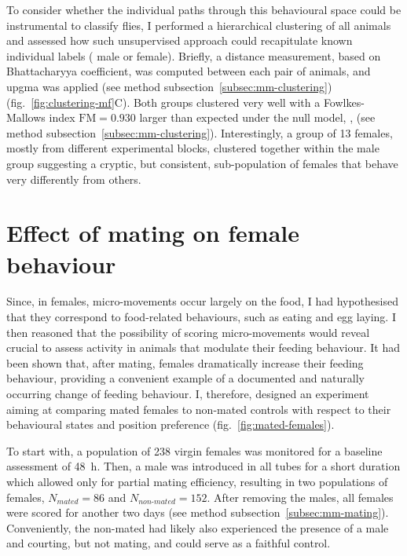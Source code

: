 

To consider whether the individual paths through this behavioural space could be instrumental to classify flies, I performed a hierarchical clustering of all animals and assessed how such unsupervised approach could recapitulate known individual labels (\ie{} male or female).
Briefly, a distance measurement, based on Bhattacharyya coefficient\cite{bhattacharyya_measure_1943}, was computed between each pair of animals, and \gls{upgma}\cite{sokal_statistical_1958} was applied (see method subsection~\ref{subsec:mm-clustering}) (fig.~\ref{fig:clustering-mf}C).
Both groups clustered very well with a
Fowlkes-Mallows index  $\text{FM} = 0.930$ larger than expected under the null model, , (see method subsection~\ref{subsec:mm-clustering}).
Interestingly, a group of 13 females, mostly from different experimental blocks, clustered together within the male group suggesting a cryptic, but consistent, sub-population of females that behave very differently from others.

\section{Effect of mating on female behaviour}

Since, in females, micro-movements occur largely on the food, I had hypothesised that they correspond to food-related behaviours, such as eating and egg laying.
I then reasoned that the possibility of scoring micro-movements would reveal crucial to assess activity in animals that modulate their feeding behaviour.
It had been shown that, after mating, females \dmel{} dramatically increase their feeding behaviour\cite{ribeiro_sex_2010}, providing a convenient example of a documented and naturally occurring change of feeding behaviour.
I, therefore, designed an experiment aiming at comparing mated females to non-mated controls with respect to their behavioural states and position preference (fig.~\ref{fig:mated-females}).



To start with, a population of 238 virgin females was monitored for a baseline assessment of 48~h.
Then, a male was introduced in all tubes for a short duration which allowed only for partial mating efficiency, resulting in two populations of females, $N_{mated} = 86$ and $N_{non\text{-}mated} = 152$.
After removing the males, all females were scored for another two days (see method subsection~\ref{subsec:mm-mating}). 
Conveniently, the non-mated had likely also experienced the presence of a male and courting, but not mating, and could serve as a faithful control.

